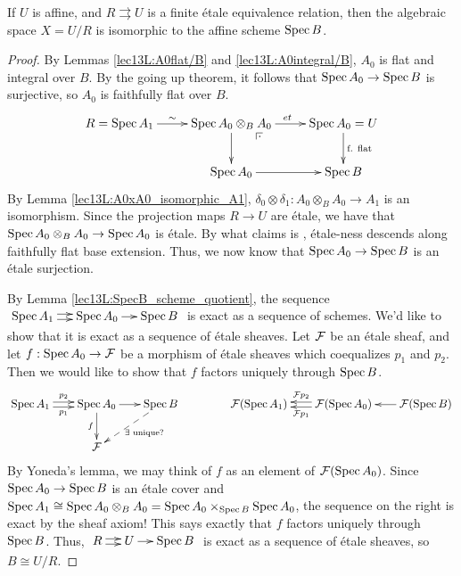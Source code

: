  \begin{theorem} \label{lec13T:U/R_affine}
   If $U$ is affine, and $R\rightrightarrows U$ is a finite \'etale equivalence relation,
   then the algebraic space $X=U/R$ is isomorphic to the affine scheme $\operatorname{Spec} B$.
 \end{theorem}
 \begin{proof}
   By Lemmas \ref{lec13L:A0flat/B} and \ref{lec13L:A0integral/B}, $A_0$ is flat and
   integral over $B$. By the going up theorem, it follows that $\operatorname{Spec} A_0\to \operatorname{Spec} B$ is
   surjective, so $A_0$ is faithfully flat over $B$.
   \[\xymatrix{
   R=\spec A_1 \ar[r]^<>(.5){\sim} & \spec A_0\otimes_B A_0 \ar[r]^{et}\ar[d]\ar@{}[dr]|(.25)\pb
   & \spec A_0 = U\ar[d]^{\text{f. flat}}\\
   & \spec A_0\ar[r] & \spec B
   }\]
    By Lemma \ref{lec13L:A0xA0_isomorphic_A1}, $\delta_0\otimes \delta_1:A_0\otimes_B
   A_0\to A_1$ is an isomorphism. Since the projection maps $R\to U$ are \'etale, we have
   that $\operatorname{Spec} A_0\otimes_B A_0\to \operatorname{Spec} A_0$ is \'etale. By what \cite{Vistoli} claims
   is \cite[IV.2.7.1]{EGA} , \'etale-ness
   descends along faithfully flat base extension. Thus, we now know that $\operatorname{Spec} A_0\to
   \operatorname{Spec} B$ is an \'etale surjection.

   By Lemma \ref{lec13L:SpecB_scheme_quotient}, the sequence $\xymatrix@-1pc{\spec A_1
   \ar@<.5ex>[r]\ar@<-.5ex>[r] & \spec A_0\ar[r] & \spec B}$ is exact as a sequence of
   schemes. We'd like to show that it is exact as a sequence of \'etale sheaves. Let $\mathcal{F}$
   be an \'etale sheaf, and let $f:\operatorname{Spec} A_0\to \mathcal{F}$ be a morphism of \'etale sheaves
   which coequalizes $p_1$ and $p_2$. Then we would like to show that $f$ factors
   uniquely through $\operatorname{Spec} B$.
   \[\xymatrix@C-.5pc{
   \spec A_1 \ar@<.5ex>[r]^{p_2}\ar@<-.5ex>[r]_{p_1} & \spec A_0\ar[r] \ar[d]_f
   & \spec B \ar@{-->}[dl]^{\exists \text{ unique?}} \\ & \F
   }\qquad\qquad
   \xymatrix@C-.5pc{
    \F(\spec A_1) & \F(\spec A_0) \ar@<.5ex>[l]^{\F p_1}\ar@<-.5ex>[l]_{\F p_2}
    & \F(\spec B) \ar[l]
   }\]
   By Yoneda's lemma, we may think of $f$ as an element of $\mathcal{F}(\operatorname{Spec} A_0)$.
   Since $\operatorname{Spec} A_0\to \operatorname{Spec} B$ is an \'etale cover and $\operatorname{Spec} A_1\cong \operatorname{Spec}
   A_0\otimes_B A_0 = \operatorname{Spec} A_0 \times_{\operatorname{Spec} B} \operatorname{Spec} A_0$, the sequence on the
   right is exact by the sheaf axiom! This says exactly that $f$ factors uniquely through
   $\operatorname{Spec} B$. Thus, $\xymatrix@-1pc{R\ar@<.5ex>[r]\ar@<-.5ex>[r]& U\ar[r] & \spec B}$ is
   exact as a sequence of \'etale sheaves, so $B\cong U/R$.
 \end{proof}

